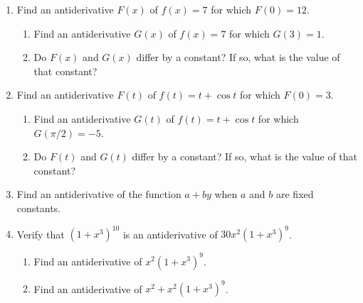 \begin{enumerate}
\begin{enumerate}
  \item $\dint dx$


  \item $\dint e^{z+2} \, dz$


  \item $\dint \cos(4x) \, dx$


  \item $\dint \dfrac{5}{1+r^2}\,dr$


  \item $\dint \dfrac{1}{\sqrt{1-4s^2}}\, ds$
\mbox{}



\end{enumerate}
\item Find an antiderivative $F(x)$ of $f(x) = 7$ for which $F(0) =
12$.

  \begin{enumerate}
  \item Find an antiderivative $G(x)$ of $f(x) = 7$ for which $G(3) = 1$.

  \item Do $F(x)$ and $G(x)$ differ by a constant?  If so, what is the
value of that constant?



\end{enumerate}
\item Find an antiderivative $F(t)$ of $f(t) = t + \cos{t}$ for which
$F(0) = 3$.

  \begin{enumerate}
  \item Find an antiderivative $G(t)$ of $f(t) = t + \cos{t}$ for which
$G(\pi/2) = -5$.

  \item Do $F(t)$ and $G(t)$ differ by a constant?  If so, what is the
value of that constant?


\end{enumerate}
\item Find an antiderivative of the function $a + by$ when $a$ and $b$
are fixed constants.


\item Verify that $(1 + x^3)^{10}$ is an antiderivative of $30x^2(1 +
x^3)^9$.

  \begin{enumerate}
  \item Find an antiderivative of $x^2(1 + x^3)^9$.

  \item Find an antiderivative of $x^2 + x^2(1 + x^3)^9$.



\end{enumerate}
\end{enumerate}
